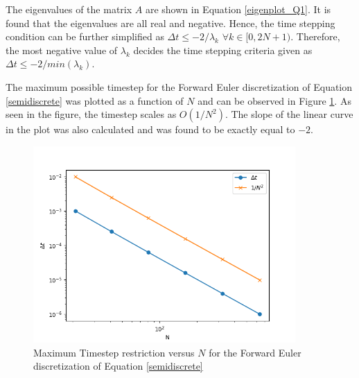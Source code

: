 \documentclass[12pt,dvipsnames]{article}
\begin{document}
The eigenvalues of the matrix $A$ are shown in Equation \ref{eigenplot_Q1}. It is found that the eigenvalues are all real and negative. Hence, the time stepping condition can be further simplified as $\Delta t \leq -2 / \lambda_k$ $\forall k \in [0, 2N + 1)$. Therefore, the most negative value of $\lambda_k$ decides the time stepping criteria given as $\Delta t \leq -2/min(\lambda_k)$.

The maximum possible timestep for the Forward Euler discretization of Equation \ref{semidiscrete} was plotted as a function of $N$ and can be observed in Figure \ref{timestep_restrict_Q1}. As seen in the figure, the timestep scales as $O(1/N^2)$. The slope of the linear curve in the plot was also calculated and was found to be exactly equal to $-2$.
\begin{figure}
    \centering
    \includegraphics[width = 10cm]{dtvariation.png}
    \caption{Maximum Timestep restriction versus $N$ for the Forward Euler discretization of Equation \ref{semidiscrete} }
    \label{timestep_restrict_Q1}
\end{figure}
\end{document}
